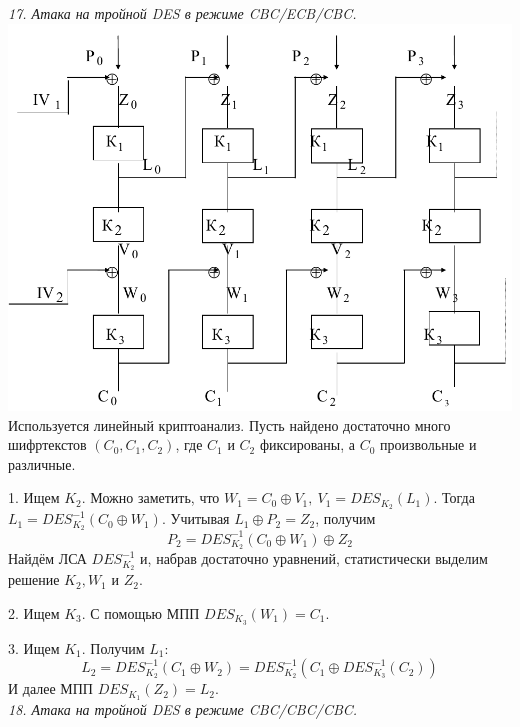 \noindent \textit{17. Атака на тройной DES в режиме CBC/ECB/CBC.} \\

\includegraphics[scale=.4]{eka/img/CBC_ECB_CBC.png} \\

Используется линейный криптоанализ. Пусть найдено достаточно много шифртекстов $(C_0, C_1, C_2)$, где $C_1$ и $C_2$ фиксированы, а $C_0$ произвольные и различные.

1. Ищем $K_2$. Можно заметить, что $W_1 = C_0 \oplus V_1,\ V_1 = DES_{K_2}(L_1)$. Тогда $L_1 = DES_{K_2}^{-1}(C_0 \oplus W_1)$. Учитывая $L_1 \oplus P_2 = Z_2$, получим
$$P_2 = DES_{K_2}^{-1}(C_0 \oplus W_1) \oplus Z_2$$
Найдём ЛСА $DES_{K_2}^{-1}$ и, набрав достаточно уравнений, статистически выделим решение $K_2, W_1$ и $Z_2$.

2. Ищем $K_3$. С помощью МПП $DES_{K_3}(W_1) = C_1$.

3. Ищем $K_1$. Получим $L_1$:
$$L_2 = DES_{K_2}^{-1}(C_1 \oplus W_2) = DES_{K_2}^{-1}(C_1 \oplus DES_{K_3}^{-1}(C_2))$$
И далее МПП $DES_{K_1}(Z_2) = L_2$. \\

\newpage
\noindent \textit{18. Атака на тройной DES в режиме CBC/CBC/CBC.} \\

